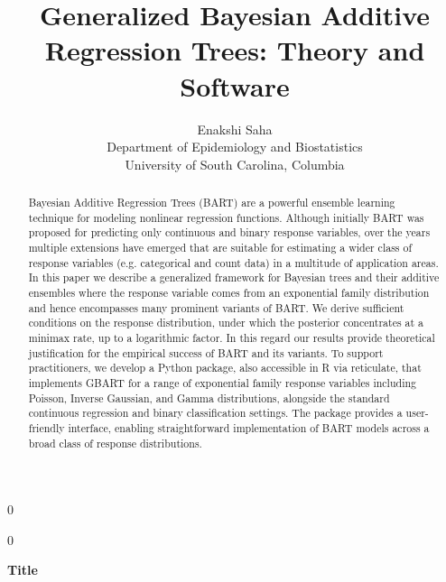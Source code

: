 \documentclass[12pt]{article}
\newcommand{\1}{\mathbb{I}}
\theoremstyle{plain}
\theoremstyle{definition}
\theoremstyle{remark}
\newcommand{\blind}{0}
\begin{document}
%

\def\spacingset#1{\renewcommand{\baselinestretch}%
{#1}\small\normalsize} \spacingset{1}



\title{\bf Generalized Bayesian Additive Regression Trees: Theory and Software}

\blind
{
  \author{Enakshi Saha\\
    Department of Epidemiology and Biostatistics\\
    University of South Carolina, Columbia}
}  \fi

\maketitle

\blind
{
  \bigskip
  \bigskip
  \bigskip
  \begin{center}
    {\LARGE\bf Title}
\end{center}
  \medskip
} \fi

\bigskip
\begin{abstract}
Bayesian Additive Regression Trees (BART) are a powerful ensemble learning technique for modeling nonlinear regression functions. Although initially BART was proposed for predicting only continuous and binary response variables, over the years multiple extensions have emerged that are suitable for estimating a wider class of response variables (e.g. categorical and count data) in a multitude of application areas. In this paper we describe a generalized framework for Bayesian trees and their additive ensembles where the response variable comes from an exponential family distribution and hence encompasses many prominent variants of BART. We derive sufficient conditions on the response distribution, under which the posterior concentrates at a minimax rate, up to a logarithmic factor. In this regard our results provide theoretical justification for the empirical success of BART and its variants. To support practitioners, we develop a Python package, also accessible in R via reticulate, that implements GBART for a range of exponential family response variables including Poisson, Inverse Gaussian, and Gamma distributions, alongside the standard continuous regression and binary classification settings. The package provides a user-friendly interface, enabling straightforward implementation of BART models across a broad class of response distributions.
\end{abstract}
\end{document}
